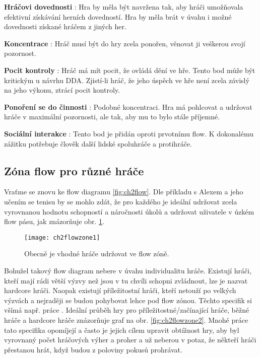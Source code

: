 \textbf{Hráčovi dovednosti} : 
Hra by měla být navržena tak, aby hráči umožňovala efektivní získávání herních dovedností. Hra by měla brát v úvahu i možné dovednosti získané hráčem z jiných her.

\textbf{Koncentrace} : 
Hráč musí být do hry zcela ponořen, věnovat ji veškerou svojí pozornost.

\textbf{Pocit kontroly} : 
Hráč má mít pocit, že ovládá dění ve hře. Tento bod může být kritickým u návrhu DDA. Zjistí-li hráč, že jeho úspěch ve hře není zcela závislý na jeho výkonu, ztrácí pocit kontroly.

\textbf{Ponoření se do činnosti} : 
Podobné koncentraci. Hra má pohlcovat a udržovat hráče v maximální pozornosti, ale tak, aby mu to bylo stále příjemné.

\textbf{Sociální interakce} : 
Tento bod je přidán oproti prvotnímu flow. K dokonalému zážitku potřebuje člověk další lidské spoluhráče a protihráče.

\subsection{Zóna flow pro různé hráče}

Vraťme se znovu ke flow diagramu \ref{fig:ch2flow}. Dle příkladu s Alexem a jeho učením se tenisu by se mohlo zdát, že pro každého je ideální udržovat zcela vyrovnanou hodnotu schopností a náročnosti úkolů a udržovat uživatele v úzkém flow pásu, jak znázorňuje obr. \ref{fig:ch2flowzone1}.

\begin{figure}
  \centering
  \texttt{[image: ch2flowzone1]}
	\caption{Obecně je vhodné hráče udržovat ve flow zóně. \cite{thesisflow} }
	\label{fig:ch2flowzone1}
\end{figure}	

Bohužel takový flow diagram nebere v úvahu individualitu hráče. Existují hráči, kteří mají rádi větší výzvy než jsou v tu chvíli schopni zvládnout, lze je nazvat hardcore hráči. Naopak existují příležitostní hráči, kteří netouží po velkých výzvách a nejraději se budou pohybovat lehce pod flow zónou. Těchto specifik si všímá např. práce \cite{RiskTakers}. Ideální průběh hry pro příležitostné/začínající hráče, běžné hráče a hardcore hráče znázorňuje graf na obr. \ref{fig:ch2flowzone2}. Mnohé práce tato specifika opomíjejí a často je jejich cílem upravit obtížnost hry, aby byl vyrovnaný počet hráčových výher a proher a už neberou v potaz, že někteří hráči přestanou hrát, když budou z poloviny pokusů prohrávat.

